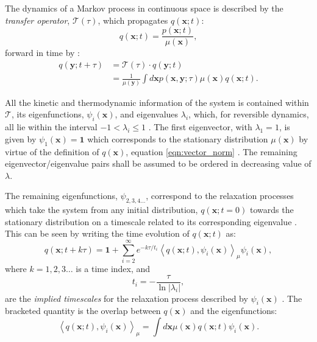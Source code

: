 The dynamics of a Markov process in continuous space is described by the \emph{transfer operator}, $\mathcal{T}(\tau)$, which propagates $q(\mathbf{x} ; t)$:
\begin{equation}\label{eqn:vector_norm}
    q(\mathbf{x} ; t) = \frac{p(\mathbf{x} ; t)}{\mu(\mathbf{x})},
\end{equation}
forward in time by \cite{prinzMarkovModelsMolecular2011}: 
\begin{equation}\label{eqn:transfer_operator}
\begin{split}
   q(\mathbf{y} ; t+\tau) &= \mathcal{T}(\tau) \cdot q(\mathbf{y} ; t) \\
   &=\frac{1}{\mu(\mathbf{y})} \int d \mathbf{x} p(\mathbf{x}, \mathbf{y} ; \tau) \mu(\mathbf{x}) q(\mathbf{x} ; t). 
\end{split}
\end{equation}

All the kinetic and thermodynamic information of the system is contained within $\mathcal{T}$, its eigenfunctions, $\psi_{i}(\mathbf{x})$, and eigenvalues $\lambda_{i}$, which, for reversible dynamics, all lie within the interval $-1 < \lambda_i \le 1$ \cite{schutteDirectApproachConformational1999}. The first eigenvector, with $\lambda_{1}=1$, is given by $\psi_{1}(\mathbf{x})=\mathbf{1}$ which corresponds to the stationary distribution $\mu(\mathbf{x})$ by virtue of the definition of $q(\mathbf{x})$, equation \ref{eqn:vector_norm} \cite{prinzMarkovModelsMolecular2011}. The remaining eigenvector/eigenvalue pairs shall be assumed to be ordered in decreasing value of $\lambda$.

The remaining eigenfunctions, $\psi_{2,3,4...}$, correspond to the relaxation processes which take the system from any initial distribution, $q(\mathbf{x} ; t=0)$ towards the stationary distribution on a timescale related to its corresponding eigenvalue \cite{prinzMarkovModelsMolecular2011}. This can be seen by writing the time evolution of $q(\mathbf{x};t)$ as:
\begin{equation}\label{eqn:eig_decomp}
q(\mathbf{x} ; t+k \tau)=\mathbf{1}+\sum_{i=2}^{\infty} e^{-k \tau / t_{i}}\left\langle q(\mathbf{x} ; t), \psi_{i}(\mathbf{x})\right\rangle_{\mu} \psi_{i}(\mathbf{x}),
\end{equation}
where $k=1,2,3 \ldots$ is a time index, and 
\begin{equation}
t_{i}=-\frac{\tau}{\ln{|\lambda_{i}|}}, 
\end{equation}
are the \emph{implied timescales} for the relaxation process described by $\psi_{i}(\mathbf{x})$ \cite{prinzMarkovModelsMolecular2011}. The bracketed quantity is the overlap between $q(\mathbf{x})$ and the eigenfunctions:
\begin{equation}
\left\langle q(\mathbf{x} ; t), \psi_{i}(\mathbf{x})\right\rangle_{\mu}=\int d \mathbf{x} \mu(\mathbf{x}) q(\mathbf{x} ; t) \psi_{i}(\mathbf{x}). 
\end{equation}


